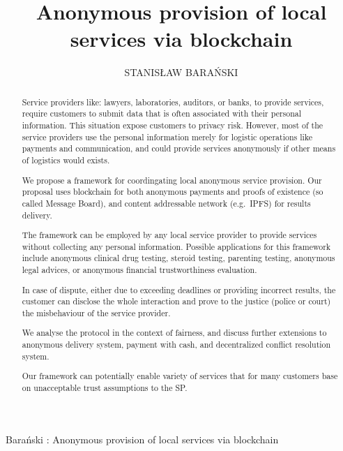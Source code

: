 \documentclass{ieeeaccess}
\begin{document}

\title{Anonymous provision of local services via blockchain}
\author{\uppercase{Stanis\l{}aw Bara{\'n}ski}}

\address[1]{Department of Electronic, Telecommunication and Informatics, Gdansk University of Technology, Narutowicza 11/12 Gdansk Poland (e-mail: stanislaw.baranski@pg.edu.pl}


{Bara{\'n}ski : 
Anonymous provision of local services via blockchain}


\begin{abstract}
Service providers like: lawyers, laboratories, auditors, or banks, to
provide services, require customers to submit data that is often
associated with their personal information. This situation expose
customers to privacy risk. However, most of the service providers use
the personal information merely for logistic operations like payments
and communication, and could provide services anonymously if other means
of logistics would exists.

We propose a framework for coordingating local anonymous service
provision. Our proposal uses blockchain for both anonymous payments and
proofs of existence (so called Message Board), and content addressable
network (e.g.~IPFS) for results delivery.

The framework can be employed by any local service provider to provide
services without collecting any personal information. Possible
applications for this framework include anonymous clinical drug testing,
steroid testing, parenting testing, anonymous legal advices, or
anonymous financial trustworthiness evaluation.

In case of dispute, either due to exceeding deadlines or providing
incorrect results, the customer can disclose the whole interaction and
prove to the justice (police or court) the misbehaviour of the service
provider.

We analyse the protocol in the context of fairness, and discuss further
extensions to anonymous delivery system, payment with cash, and
decentralized conflict resolution system.

Our framework can potentially enable variety of services that for many
customers base on unacceptable trust assumptions to the SP.
\end{abstract}
\end{document}
